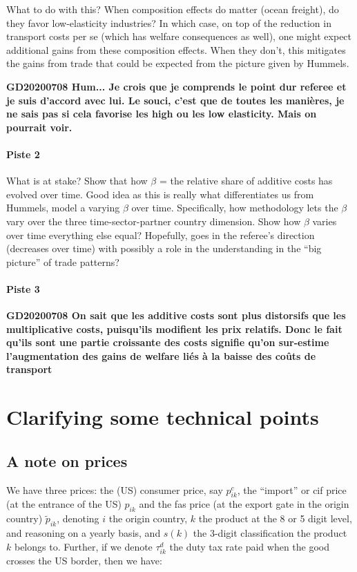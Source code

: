 \documentclass[a4paper,12pt]{article}
\begin{document}
What to do with this? When composition effects do matter (ocean freight), do they favor low-elasticity industries? In which case, on top of the reduction in transport costs per se (which has welfare consequences as well), one might expect additional gains from these composition effects. When they don't, this mitigates the gains from trade that could be expected from the picture given by Hummels.

\textbf{GD20200708 Hum... Je crois que je comprends le point dur referee et je suis d’accord avec lui. Le souci, c’est que de toutes les manières, je ne sais pas si cela favorise les high ou les low elasticity. Mais on pourrait voir.}

\paragraph{Piste 2} What is at stake? Show that how $\beta$ = the relative share of additive costs has evolved over time. Good idea as this is really what differentiates us from Hummels, model a varying $\beta$ over time. Specifically, how methodology lets the $\beta$ vary over the three time-sector-partner country dimension. Show how $\beta$ varies over time everything else equal? Hopefully, goes in the referee's direction (decreases over time) with possibly a role in the understanding in the ``big picture'' of trade patterns?

\paragraph{Piste 3} \textbf{GD20200708 On sait que les additive costs sont plus distorsifs que les multiplicative costs, puisqu’ils modifient les prix relatifs. Donc le fait qu’ils sont une partie croissante des costs signifie qu’on sur-estime l’augmentation des gains de welfare liés à la baisse des coûts de transport}

\appendix


\section{Clarifying some technical points \label{app:technical_points}}


\subsection{A note on prices}

We have three prices: the (US) consumer price, say $p^{c}_{ik}$, the ``import'' or  cif price (at the entrance of the US) $p_{ik}$ and the fas price (at the export gate in the origin country) $\widetilde{p}_{ik}$, denoting $i$ the origin country, $k$ the product at the 8 or 5 digit level, and reasoning on a yearly basis, and $s(k)$ the 3-digit classification the product $k$ belongs to. Further, if we denote $\tau^d_{ik}$ the duty tax rate paid when the good crosses the US border, then we have:
\end{document}

